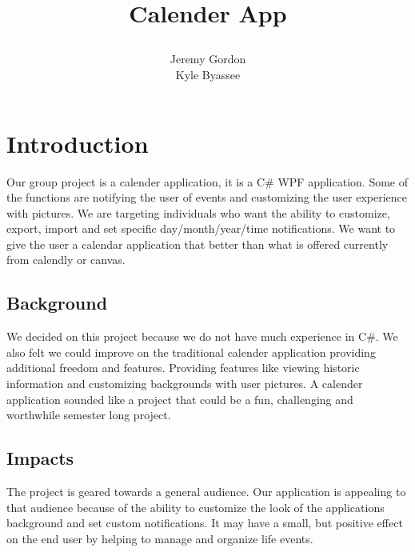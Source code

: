 \documentclass[10pt,conference,onecolumn,compsoc]{IEEEtran}
\begin{document}
\title{Calender App
%
%


\author{Jeremy Gordon\\ Kyle Byassee%
}
}

\maketitle
\IEEEdisplaynontitleabstractindextext
\IEEEpeerreviewmaketitle

\section{Introduction}
Our group project is a calender application, it is a C\# WPF application. Some of the functions are notifying the user of events and customizing the user experience with pictures. We are targeting individuals who want the ability to customize, export, import and set specific day/month/year/time notifications. 
We want to give the user a calendar application that better than what is offered currently from calendly or canvas.

\subsection{Background}
We decided on this project because we do not have much experience in C\#. We also felt we could improve on the traditional calender application providing additional freedom and features. Providing features like viewing historic information and customizing backgrounds with user pictures. A calender application sounded like a project that could be a fun, challenging and worthwhile semester long project.

\subsection{Impacts}
The project is geared towards a general audience. Our application is appealing to that audience because of the ability to customize the look of the applications background and set custom notifications. It may have a small, but positive effect on the end user by helping to manage and organize life events.
\end{document}
